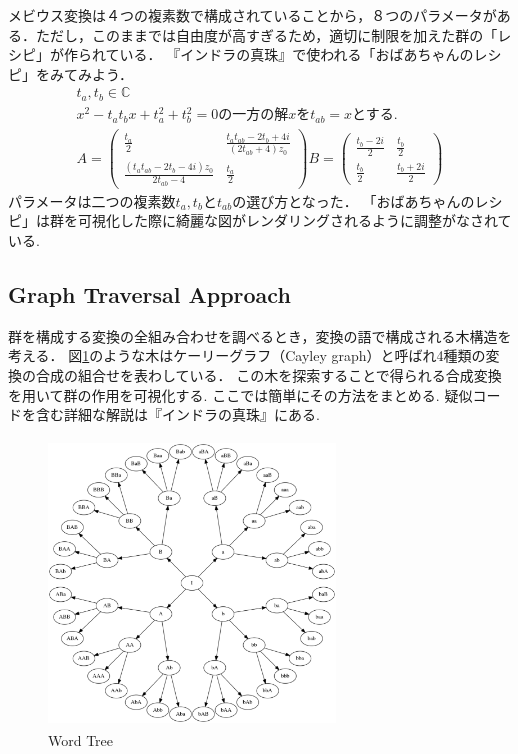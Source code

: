 メビウス変換は４つの複素数で構成されていることから，８つのパラメータがある．ただし，このままでは自由度が高すぎるため，適切に制限を加えた群の「レシピ」が作られている．
『インドラの真珠』で使われる「おばあちゃんのレシピ」をみてみよう．
\begin{eqnarray*}
 t_a, t_b \in \mathbb{C} \\
 x^2 - t_a t_b x + t_a^2 + t_b^2 = 0 \text{の一方の解}x\text{を}t_{ab} = x \text{とする. }\\
 A = \left(
      \begin{array}{ccc}
       \frac{t_a}{2} & \frac{t_a t_{ab} - 2 t_b + 4i}{(2 t_{ab} + 4)z_0} \\
       \frac{(t_a t_{ab} - 2 t_b -4i)z_0}{2 t_{ab} - 4} & \frac{t_a}{2}
      \end{array}
     \right)
 B = \left(
      \begin{array}{ccc}
       \frac{t_b - 2i}{2} & \frac{t_b}{2} \\
       \frac{t_b}{2} & \frac{t_b + 2i}{2}
      \end{array}
     \right)
\end{eqnarray*}
パラメータは二つの複素数$t_a, t_b$と$t_{ab}$の選び方となった．
「おばあちゃんのレシピ」は群を可視化した際に綺麗な図がレンダリングされるように調整がなされている.

\subsection{Graph Traversal Approach}

群を構成する変換の全組み合わせを調べるとき，変換の語で構成される木構造を考える．
図\ref{fig:wordTree}のような木はケーリーグラフ（Cayley graph）と呼ばれ4種類の変換の合成の組合せを表わしている．
この木を探索することで得られる合成変換を用いて群の作用を可視化する. ここでは簡単にその方法をまとめる.
疑似コードを含む詳細な解説は『インドラの真珠』にある.

\begin{figure}[htbp]
  \begin{center}
   \includegraphics[width=3in, height=3in, keepaspectratio]{../img/klein/wordTree.pdf}
   \caption{Word Tree}
   \label{fig:wordTree}
  \end{center}
\end{figure}

